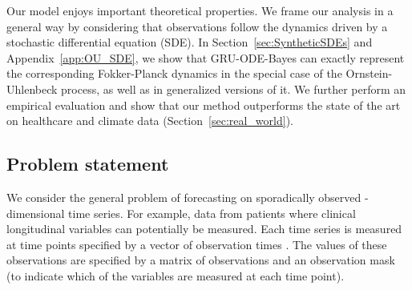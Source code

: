\documentclass{article}
\newcommand{\method}{GRU-ODE-Bayes}
\begin{document}
Our model enjoys important theoretical properties. We frame our analysis in a general way by considering that observations follow the dynamics driven by a stochastic differential equation (SDE). In Section~\ref{sec:SyntheticSDEs} and Appendix~\ref{app:OU_SDE}, we show that \method{} can exactly represent the corresponding Fokker-Planck dynamics in the special case of the Ornstein-Uhlenbeck process, as well as in generalized versions of it. 
We further perform an empirical evaluation and show that our method outperforms the state of the art on healthcare and climate data (Section~\ref{sec:real_world}).







\iffalse
---Describe briefly how Neural ODE handles irregular inputs. 
We hypothesize that the encoder-decoder split in the VAE approach \citep{neural_ode} limits the expressiveness and accuracy of modeling of the latent process. Alternatively, we take an approach inspired by stochastic differential equations (SDEs).
[Introduction of SDE equations].
On top of modeling the latent dynamics with a specially designed Neural ODE, we introduce a mechanism to \emph{filter} the latent process with the arriving observations. To filter the latent process we use a GRU-based update cell, which we call GRU-Bayes. To achieve compatibility with this filtering network, we introduce a GRU-inspired ODE (called GRU-ODE), in contrast to the ResNet-inspired one in the Neural ODE model \citep{neural_ode}.
Reference Section~WQ. \fi

\iffalse
The combination of GRU-ODE and GRU-Bayes results in a network that can model the latent dynamics of the SDE. While in the case of the Neural ODE \citep{neural_ode}, the learning of the resulting system required solving and backpropagating through an ODE, in our case we have to solve and backpropagate through an ODE with jumps.
For this, we present an efficient and \emph{mini-batch friendly} approach based on the Euler method in Section~UY. \fi

\subsection{Problem statement}
We consider the general problem of forecasting on  sporadically observed -dimensional time series. For example, data from  patients where  clinical longitudinal variables can potentially be measured. Each time series  is measured at  time points specified by a vector of observation times . The values of these observations are specified by a matrix of observations  and an observation mask  (to indicate which of the variables are measured at each time point). 
\end{document}
